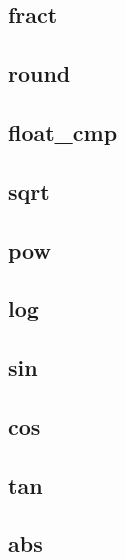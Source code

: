 \hypertarget{Available_Native_Calls_Page_Fract_Desc}{}\subsection{fract}\label{Available_Native_Calls_Page_Fract_Desc}
\hypertarget{Available_Native_Calls_Page_Round_Desc}{}\subsection{round}\label{Available_Native_Calls_Page_Round_Desc}
\hypertarget{Available_Native_Calls_Page_Float_Cmp_Desc}{}\subsection{float\_\-cmp}\label{Available_Native_Calls_Page_Float_Cmp_Desc}
\hypertarget{Available_Native_Calls_Page_Sqrt_Desc}{}\subsection{sqrt}\label{Available_Native_Calls_Page_Sqrt_Desc}
\hypertarget{Available_Native_Calls_Page_Pow_Desc}{}\subsection{pow}\label{Available_Native_Calls_Page_Pow_Desc}
\hypertarget{Available_Native_Calls_Page_Log_Desc}{}\subsection{log}\label{Available_Native_Calls_Page_Log_Desc}
\hypertarget{Available_Native_Calls_Page_Sin_Desc}{}\subsection{sin}\label{Available_Native_Calls_Page_Sin_Desc}
\hypertarget{Available_Native_Calls_Page_Cos_Desc}{}\subsection{cos}\label{Available_Native_Calls_Page_Cos_Desc}
\hypertarget{Available_Native_Calls_Page_Tan_Desc}{}\subsection{tan}\label{Available_Native_Calls_Page_Tan_Desc}
\hypertarget{Available_Native_Calls_Page_Abs_Desc}{}\subsection{abs}\label{Available_Native_Calls_Page_Abs_Desc}
